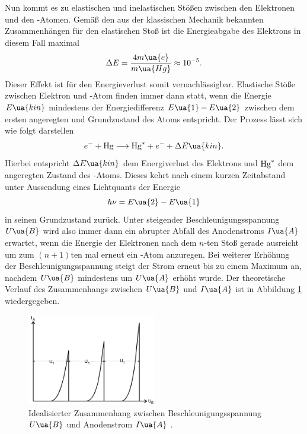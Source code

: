 Nun kommt es zu elastischen und inelastischen Stößen zwischen den Elektronen und den -Atomen. Gemäß
den aus der klassischen Mechanik bekannten Zusammenhängen für den elastischen Stoß ist die Energieabgabe
des Elektrons in diesem Fall maximal
\begin{equation}
  \Delta E = \frac{4 m\ua{e}}{m\ua{Hg}} \approx \num{e-5}.
\end{equation}
Dieser Effekt ist für den Energieverlust somit vernachlässigbar. Elastische Stöße zwischen Elektron und
-Atom finden immer dann statt, wenn die Energie $E\ua{kin}$ mindestens der Energiedifferenz $E\ua{1} - E\ua{2}$
zwischen dem ersten angeregten und Grundzustand des  Atoms entspricht. Der Prozess lässt sich wie folgt darstellen
\begin{equation}
  e^{-} + \ce{Hg} \longrightarrow \ce{Hg}^{*} + e^{-} + \Delta E\ua{kin}.
\end{equation}
Hierbei entspricht $\Delta E\ua{kin}$ dem Energiverlust des Elektrons und $\ce{Hg}^*$ dem angeregten Zustand des
-Atoms. Dieses kehrt nach einem kurzen Zeitabstand unter Aussendung eines Lichtquants der Energie
\begin{equation}
  h\nu = E\ua{2} - E\ua{1}
\end{equation}
in seinen Grundzustand zurück. Unter steigender Beschleunigungsspannung $U\ua{B}$ wird also immer dann ein
abrupter Abfall des Anodenstroms $I\ua{A}$ erwartet, wenn die Energie der Elektronen nach dem $n$-ten Stoß gerade
ausreicht um zum $(n+1)$ten mal erneut ein -Atom anzuregen. Bei weiterer Erhöhung der Beschleunigungsspannung
steigt der Strom erneut bis zu einem Maximum an, nachdem $U\ua{B}$ mindestens um $U\ua{A}$ erhöht wurde.
Der theoretische Verlauf des Zusammenhangs zwischen
$U\ua{B}$ und $I\ua{A}$ ist in Abbildung \ref{fig: theo_verlauf} wiedergegeben.
\begin{figure}
  \centering
  \includegraphics[width = 0.5\textwidth]{pics/theo_verlauf.png}
  \caption{Idealisierter Zusammenhang zwischen Beschleunigungsspannung $U\ua{B}$ und Anodenstrom $I\ua{A}$ \cite{anleitung601}.}
  \label{fig: theo_verlauf}
\end{figure}
